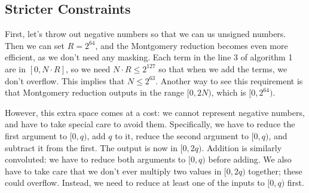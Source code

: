 \documentclass[../fheimpl.tex]{subfiles}
\begin{document}
\subsection{Stricter Constraints}
First, let's throw out negative numbers so that we can us unsigned numbers. Then we can set $R=2^{64}$, and the Montgomery reduction becomes even more efficient, as we don't need any masking. Each term in the line 3 of algorithm 1 are in $[0,N\cdot R]$, so we need $N\cdot R \le 2^{127}$ so that when we add the terms, we don't overflow. This implies that $N\le 2^{63}$. Another way to see this requirement is that Montgomery reduction outputs in the range $[0,2N)$, which is $[0, 2^{64})$.

However, this extra space comes at a cost: we cannot represent negative numbers, and have to take special care to avoid them. Specifically, we have to reduce the first argument to $[0,q)$, add $q$ to it, reduce the second argument to $[0,q)$, and subtract it from the first. The output is now in $[0,2q)$. Addition is similarly convoluted: we have to reduce both arguments to $[0,q)$ before adding. We also have to take care that we don't ever multiply two values in $[0, 2q)$ together; these could overflow. Instead, we need to reduce at least one of the inputs to $[0,q)$ first.


    
    \ifcompileasbook
    \else
    \printbibliography
    \fi
	
\end{document}

